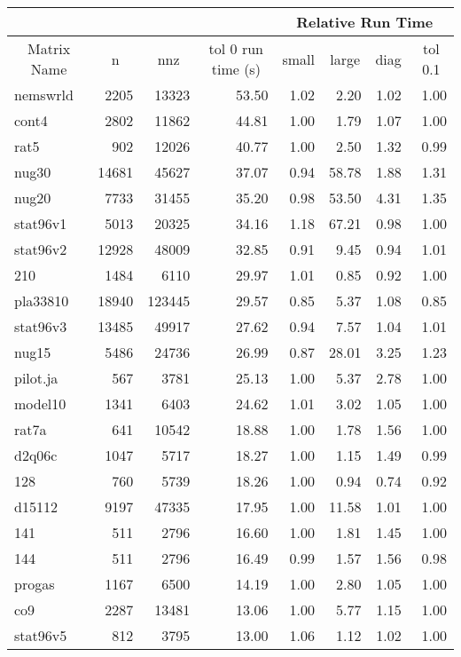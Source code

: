 \documentclass[10pt]{article}
\begin{document}
\begin{longtable}{|l|r|r|r|r|r|r|r|}
\hline	
& & & & \multicolumn{4}{c|}{Relative Run Time}  \\ \hline
\multicolumn{1}{|c|}{Matrix Name}	& \multicolumn{1}{c|}{n} & \multicolumn{1}{c|}{nnz} & \multicolumn{1}{c|}{tol 0 run time (s)} & \multicolumn{1}{c|}{small} & \multicolumn{1}{c|}{large} & \multicolumn{1}{c|}{diag} & \multicolumn{1}{c|}{tol 0.1} \\  \hline \endhead
nemswrld	&	2205	&	13323	&	53.50	&	1.02	&	2.20	&	1.02	&	1.00	\\
cont4	&	2802	&	11862	&	44.81	&	1.00	&	1.79	&	1.07	&	1.00	\\
rat5	&	902	&	12026	&	40.77	&	1.00	&	2.50	&	1.32	&	0.99	\\
nug30	&	14681	&	45627	&	37.07	&	0.94	&	58.78	&	1.88	&	1.31	\\
nug20	&	7733	&	31455	&	35.20	&	0.98	&	53.50	&	4.31	&	1.35	\\
stat96v1	&	5013	&	20325	&	34.16	&	1.18	&	67.21	&	0.98	&	1.00	\\
stat96v2	&	12928	&	48009	&	32.85	&	0.91	&	9.45	&	0.94	&	1.01	\\
210	&	1484	&	6110	&	29.97	&	1.01	&	0.85	&	0.92	&	1.00	\\
pla33810	&	18940	&	123445	&	29.57	&	0.85	&	5.37	&	1.08	&	0.85	\\
stat96v3	&	13485	&	49917	&	27.62	&	0.94	&	7.57	&	1.04	&	1.01	\\
nug15	&	5486	&	24736	&	26.99	&	0.87	&	28.01	&	3.25	&	1.23	\\
pilot.ja	&	567	&	3781	&	25.13	&	1.00	&	5.37	&	2.78	&	1.00	\\
model10	&	1341	&	6403	&	24.62	&	1.01	&	3.02	&	1.05	&	1.00	\\
rat7a	&	641	&	10542	&	18.88	&	1.00	&	1.78	&	1.56	&	1.00	\\
d2q06c	&	1047	&	5717	&	18.27	&	1.00	&	1.15	&	1.49	&	0.99	\\
128	&	760	&	5739	&	18.26	&	1.00	&	0.94	&	0.74	&	0.92	\\
d15112	&	9197	&	47335	&	17.95	&	1.00	&	11.58	&	1.01	&	1.00	\\
141	&	511	&	2796	&	16.60	&	1.00	&	1.81	&	1.45	&	1.00	\\
144	&	511	&	2796	&	16.49	&	0.99	&	1.57	&	1.56	&	0.98	\\
progas	&	1167	&	6500	&	14.19	&	1.00	&	2.80	&	1.05	&	1.00	\\
co9	&	2287	&	13481	&	13.06	&	1.00	&	5.77	&	1.15	&	1.00	\\
stat96v5	&	812	&	3795	&	13.00	&	1.06	&	1.12	&	1.02	&	1.00	\\

\end{longtable}
\end{document}
